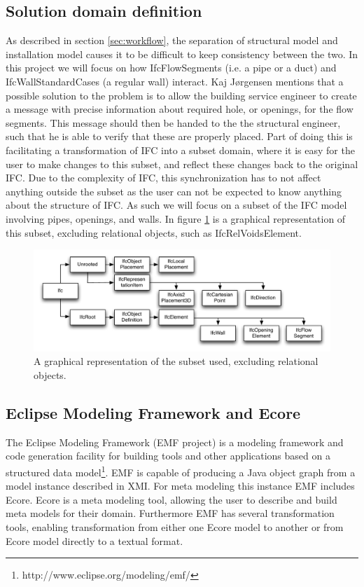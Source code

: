 \subsection{Solution domain definition}
\label{sec:solution_domain_definition}
As described in section \ref{sec:workflow}, the separation of structural model and installation model causes it to be difficult to keep consistency between the two. In this project we will focus on how IfcFlowSegments (i.e. a pipe or a duct) and IfcWallStandardCases (a regular wall) interact. Kaj J\o rgensen mentions that a possible solution to the problem is to allow the building service engineer to create a message with precise information about required hole, or openings, for the flow segments. This message should then be handed to the the structural engineer, such that he is able to verify that these are properly placed. Part of doing this is facilitating a transformation of IFC into a subset domain, where it is easy for the user to make changes to this subset, and reflect these changes back to the original IFC. Due to the complexity of IFC, this synchronization has to not affect anything outside the subset as the user can not be expected to know anything about the structure of IFC. As such we will focus on a subset of the IFC model involving pipes, openings, and walls. In figure \ref{fig:ifcheirachy} is a graphical representation of this subset, excluding relational objects, such as IfcRelVoidsElement.

\begin{figure}[htbp]
    \centering
        \includegraphics[width=120mm]{images/IfcHeirachy.pdf}
    \caption{A graphical representation of the subset used, excluding relational objects.}
    \label{fig:ifcheirachy}
\end{figure}

\subsection{Eclipse Modeling Framework and Ecore}
The Eclipse Modeling Framework (EMF project) is a modeling framework and code generation facility for building tools and other applications based on a structured data model\footnote{http://www.eclipse.org/modeling/emf/}. EMF is capable of producing a Java object graph from a model instance described in XMI. For meta modeling this instance EMF includes Ecore. Ecore is a meta modeling tool, allowing the user to describe and build meta models for their domain. Furthermore EMF has several transformation tools, enabling transformation from either one Ecore model to another or from Ecore model directly to a textual format.